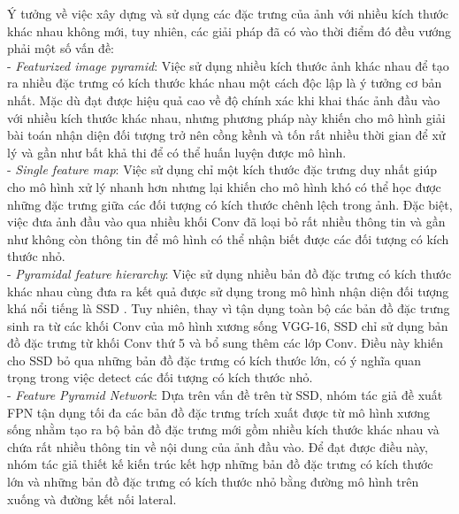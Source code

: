 {    \noindent
    Ý tưởng về việc xây dựng và sử dụng các đặc trưng của ảnh với nhiều kích thước khác nhau không mới, tuy nhiên, các giải pháp đã có vào thời điểm đó đều vướng phải một số vấn đề: \\
    - \textit{Featurized image pyramid}: Việc sử dụng nhiều kích thước ảnh khác nhau để tạo ra nhiều đặc trưng có kích thước khác nhau một cách độc lập là ý tưởng cơ bản nhất. Mặc dù đạt được hiệu quả cao về độ chính xác khi khai thác ảnh đầu vào với nhiều kích thước khác nhau, nhưng phương pháp này khiến cho mô hình giải bài toán nhận diện đối tượng trở nên cồng kềnh và tốn rất nhiều thời gian để xử lý và gần như bất khả thi để có thể huấn luyện được mô hình. \\
    - \textit{Single feature map}: Việc sử dụng chỉ một kích thước đặc trưng duy nhất giúp cho mô hình xử lý nhanh hơn nhưng lại khiến cho mô hình khó có thể học được những đặc trưng giữa các đối tượng có kích thước chênh lệch trong ảnh. Đặc biệt, việc đưa ảnh đầu vào qua nhiều khối Conv đã loại bỏ rất nhiều thông tin và gần như không còn thông tin để mô hình có thể nhận biết được các đối tượng có kích thước nhỏ. \\
    - \textit{Pyramidal feature hierarchy}: Việc sử dụng nhiều bản đồ đặc trưng có kích thước khác nhau cùng đưa ra kết quả được sử dụng trong mô hình nhận diện đối tượng khá nổi tiếng là SSD \cite{liu2016ssd}. Tuy nhiên, thay vì tận dụng toàn bộ các bản đồ đặc trưng sinh ra từ các khối Conv của mô hình xương sống VGG-16, SSD chỉ sử dụng bản đồ đặc trưng từ khối Conv thứ 5 và bổ sung thêm các lớp Conv. Điều này khiến cho SSD bỏ qua những bản đồ đặc trưng có kích thước lớn, có ý nghĩa quan trọng trong việc detect các đối tượng có kích thước nhỏ. \\
    - \textit{Feature Pyramid Network}: Dựa trên vấn đề trên từ SSD, nhóm tác giả đề xuất FPN tận dụng tối đa các bản đồ đặc trưng trích xuất được từ mô hình xương sống nhằm tạo ra bộ bản đồ đặc trưng mới gồm nhiều kích thước khác nhau và chứa rất nhiều thông tin về nội dung của ảnh đầu vào. Để đạt được điều này, nhóm tác giả thiết kế kiến trúc kết hợp những bản đồ đặc trưng có kích thước lớn và những bản đồ đặc trưng có kích thước nhỏ bằng đường mô hình trên xuống và đường kết nối lateral.

}
